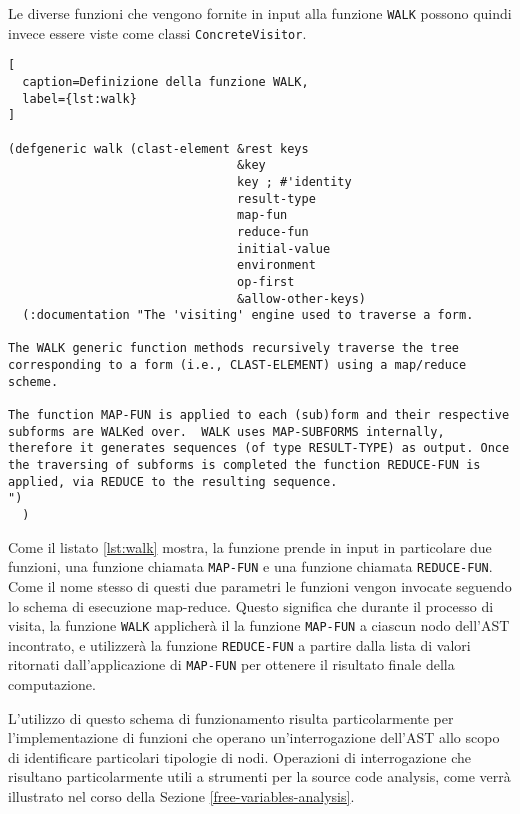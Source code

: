 Le diverse funzioni che vengono fornite in input alla funzione \texttt{WALK}
possono quindi invece essere viste come classi \texttt{ConcreteVisitor}.\\

\begin{lstlisting}[
  caption=Definizione della funzione WALK,
  label={lst:walk}
]

(defgeneric walk (clast-element &rest keys
                                &key
                                key ; #'identity
                                result-type
                                map-fun
                                reduce-fun
                                initial-value
                                environment
                                op-first
                                &allow-other-keys)
  (:documentation "The 'visiting' engine used to traverse a form.

The WALK generic function methods recursively traverse the tree
corresponding to a form (i.e., CLAST-ELEMENT) using a map/reduce
scheme.

The function MAP-FUN is applied to each (sub)form and their respective
subforms are WALKed over.  WALK uses MAP-SUBFORMS internally,
therefore it generates sequences (of type RESULT-TYPE) as output. Once
the traversing of subforms is completed the function REDUCE-FUN is
applied, via REDUCE to the resulting sequence.
")
  )

\end{lstlisting}

Come il listato \ref{lst:walk} mostra, la funzione prende in input in
particolare due funzioni, una funzione chiamata \texttt{MAP-FUN} e una funzione
chiamata \texttt{REDUCE-FUN}. Come il nome stesso di questi due parametri le
funzioni vengon invocate seguendo lo schema di esecuzione map-reduce. Questo
significa che durante il processo di visita, la funzione \texttt{WALK}
applicherà il la funzione \texttt{MAP-FUN} a ciascun nodo dell'AST incontrato, e
utilizzerà la funzione \texttt{REDUCE-FUN} a partire dalla lista di valori
ritornati dall'applicazione di \texttt{MAP-FUN} per ottenere il risultato finale
della computazione.

L'utilizzo di questo schema di funzionamento risulta particolarmente per
l'implementazione di funzioni che operano un'interrogazione dell'AST allo scopo
di identificare particolari tipologie di nodi. Operazioni di interrogazione che
risultano particolarmente utili a strumenti per la source code analysis, come
verrà illustrato nel corso della Sezione \ref{free-variables-analysis}.\\

